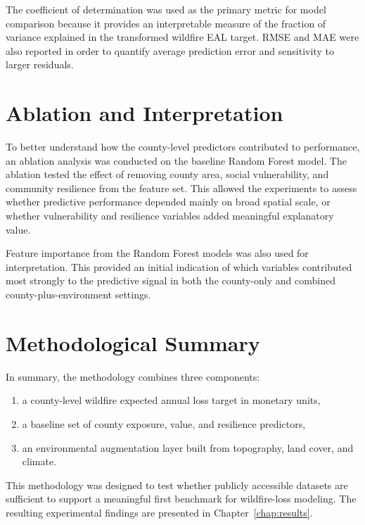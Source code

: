 The coefficient of determination was used as the primary metric for model comparison because it provides an interpretable measure of the fraction of variance explained in the transformed wildfire EAL target. RMSE and MAE were also reported in order to quantify average prediction error and sensitivity to larger residuals.

\section{Ablation and Interpretation}

To better understand how the county-level predictors contributed to performance, an ablation analysis was conducted on the baseline Random Forest model. The ablation tested the effect of removing county area, social vulnerability, and community resilience from the feature set. This allowed the experiments to assess whether predictive performance depended mainly on broad spatial scale, or whether vulnerability and resilience variables added meaningful explanatory value.

Feature importance from the Random Forest models was also used for interpretation. This provided an initial indication of which variables contributed most strongly to the predictive signal in both the county-only and combined county-plus-environment settings.

\section{Methodological Summary}

In summary, the methodology combines three components:
\begin{enumerate}
    \item a county-level wildfire expected annual loss target in monetary units,
    \item a baseline set of county exposure, value, and resilience predictors,
    \item an environmental augmentation layer built from topography, land cover, and climate.
\end{enumerate}

This methodology was designed to test whether publicly accessible datasets are sufficient to support a meaningful first benchmark for wildfire-loss modeling. The resulting experimental findings are presented in Chapter~\ref{chap:results}.
